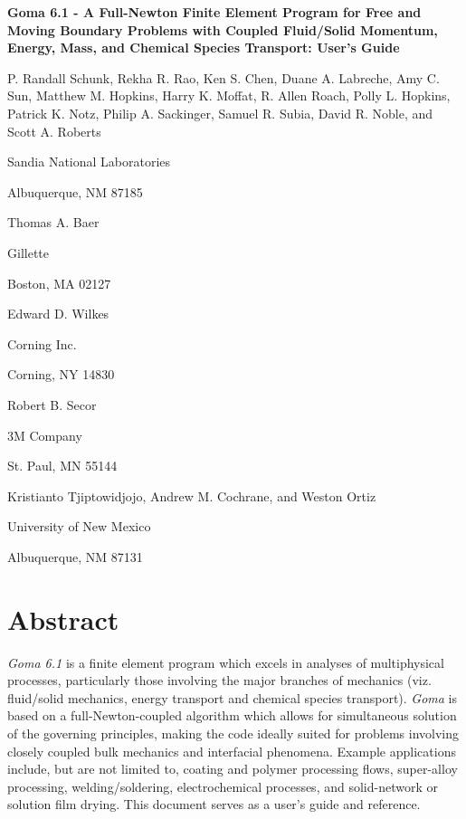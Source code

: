 \thispagestyle{empty}
\begin{titlepage}
\begin{center}
%
\LARGE
\textbf{Goma 6.1 - A Full-Newton Finite Element Program for Free and Moving Boundary Problems with Coupled Fluid/Solid Momentum, Energy, Mass, and Chemical Species Transport: User’s Guide}
%
\vfill
\end{center}
P. Randall Schunk, Rekha R. Rao, Ken S. Chen, Duane A. Labreche, Amy C. Sun, Matthew M. Hopkins, Harry K. Moffat, R. Allen Roach, Polly L. Hopkins, Patrick K. Notz, Philip A. Sackinger, Samuel R. Subia, David R. Noble, and Scott A. Roberts
%
\centerline{Sandia National Laboratories}
\centerline{Albuquerque, NM 87185} 
%
\vfill
\centerline{Thomas A. Baer}
\centerline{Gillette}
\centerline{Boston, MA 02127}
%
\vfill
\centerline{Edward D. Wilkes}
\centerline{Corning Inc.}
\centerline{Corning, NY 14830 }
%
\vfill
\centerline{Robert B. Secor} 
\centerline{3M Company}
\centerline{St. Paul, MN 55144}
%
\vfill
\centerline{Kristianto Tjiptowidjojo, Andrew M. Cochrane, and Weston Ortiz}
\centerline{University of New Mexico}
\centerline{Albuquerque, NM 87131}	
%
\normalsize
\end{titlepage}
%
%
%
\newpage
{}
{}
\setcounter{chapter}{0}
\setcounter{page}{0}
\renewcommand{\headrulewidth}{0pt}
\lhead{}
\rhead{\thepage}
\cfoot{}
%
\chapter*{Abstract}
%
\emph{Goma 6.1} is a finite element program which excels in analyses of multiphysical processes,
particularly those involving the major branches of mechanics (viz. fluid/solid mechanics, energy
transport and chemical species transport). \emph{Goma} is based on a full-Newton-coupled algorithm
which allows for simultaneous solution of the governing principles, making the code ideally
suited for problems involving closely coupled bulk mechanics and interfacial phenomena.
Example applications include, but are not limited to, coating and polymer processing flows,
super-alloy processing, welding/soldering, electrochemical processes, and solid-network or
solution film drying. This document serves as a user’s guide and reference.
%
%
\newpage
{}
{}
\vfill
